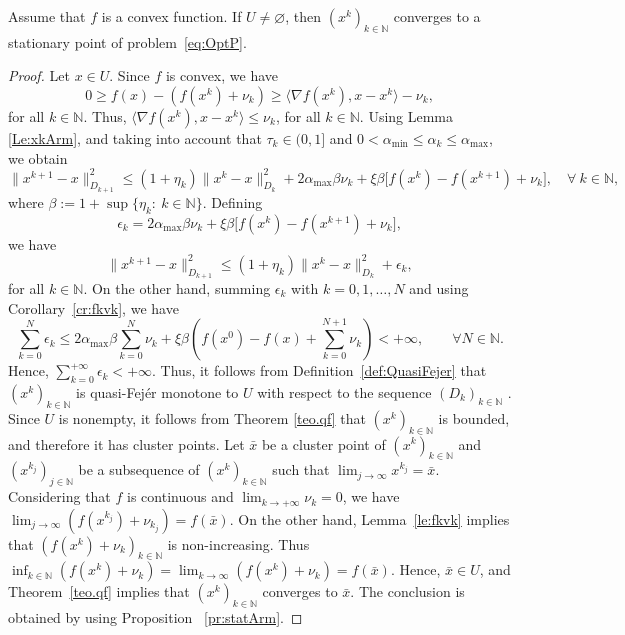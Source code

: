 \begin{corollary} \label{cor:xkquasifeArm}
	Assume that $f$ is a convex function. If $U \neq \varnothing$, then $(x^k)_{k\in\mathbb{N}}$ converges to a stationary point of problem~\eqref{eq:OptP}.
\end{corollary}
\begin{proof}
	Let $x \in U$.  Since  $f$ is convex, we have
	$$
		0\geq f(x)-(f(x^k)+\nu_k)\geq \langle \nabla f(x^k),x-x^k\rangle -\nu_k,
	$$
	for all $k\in \mathbb{N}$. Thus, $\langle \nabla f(x^k),x-x^k\rangle\leq \nu_k$, for all $k\in \mathbb{N}$.   Using Lemma \ref{Le:xkArm},  and taking into account  that  $\tau_k \in (0, 1]$  and  $0<\alpha_{\min}\leq \alpha_k \leq \alpha_{\max}$,  we obtain
	{
	$$
		\|x^{k+1}-x\|_{D_{k+1}}^2 \leq (1+\eta_k)\|x^k-x\|_{D_k}^2+2 \alpha_{\max}\beta \nu_k+ \xi \beta \big[f(x^k) - f(x^{k+1}) +\nu_k\big], \quad \forall~k \in \mathbb{N},
	$$
	where $\beta:=1+\sup\{\eta_k:~k\in\mathbb{N}\} $.
	Defining
	$$
		\epsilon_k =  2 \alpha_{\max} \beta \nu_k + \xi \beta\big[f(x^k) - f(x^{k+1}) +\nu_k\big],
	$$
	we have
	$$
		\|x^{k+1}-x\|_{D_{k+1}}^2 \leq (1+\eta_k)\|x^k-x\|_{D_k}^2+ \epsilon_k,
	$$
	for all $k \in \mathbb{N}$}. On the other hand, summing $\epsilon_k$ with $k = 0, 1, \ldots, N$ and using  Corollary~\ref{cr:fkvk},  we have
		{
			$$
				\sum_{k=0}^N \epsilon_k \leq 2   \alpha_{\max} \beta \sum_{k=0}^N \nu_k +  \xi \beta\left(f(x^0) - f(x) + \sum_{k=0}^{N+1} \nu_k \right) < +\infty, \qquad \forall N \in \mathbb{N}.
			$$
		}
	Hence, $\sum_{k=0}^{+\infty} \epsilon_k<+\infty$.  Thus, it follows from  Definition~\ref{def:QuasiFejer}  that $(x^k)_{k\in\mathbb{N}}$ is quasi-Fej\'er monotone to $U$ with respect to the sequence  $(D_k)_{k\in\mathbb{N}}$ . Since  $U$ is nonempty, it follows from Theorem \ref{teo.qf} that $(x^k)_{k\in\mathbb{N}}$ is bounded, and therefore it has cluster points. Let $\bar{x}$ be a cluster point of $(x^k)_{k\in\mathbb{N}}$ and $(x^{k_j})_{j\in\mathbb{N}}$ be a subsequence of $(x^k)_{k\in\mathbb{N}}$ such that $\lim_{j \to \infty} x^{k_j} = \bar{x}$. Considering that $f$ is continuous and $\lim_{k\to +\infty} \nu_{k} = 0$, we have $\lim_{j \to \infty} (f(x^{k_j})+\nu_{k_j})= f(\bar{x})$.  On the other hand, Lemma~\ref{le:fkvk} implies that  $\left(f(x^k)+\nu_k\right)_{k\in\mathbb{N}}$ is  non-increasing. Thus  $\inf_{k\in {\mathbb N}}(f(x^{k})+\nu_k)= \lim_{k \to \infty} (f(x^{k})+\nu_{k}) = f(\bar{x}).$ Hence, $\bar{x} \in U$, and  Theorem~\ref{teo.qf}  implies that $(x^k)_{k\in\mathbb{N}}$ converges to $\bar{x}$.  The conclusion is obtained  by  using   Proposition ~\ref{pr:statArm}.
\end{proof}

